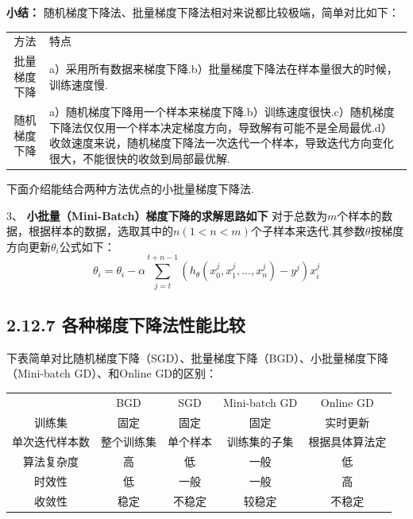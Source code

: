 \textbf{小结：}
随机梯度下降法、批量梯度下降法相对来说都比较极端，简单对比如下：

\begin{longtable}[]{ cl }
\begin{minipage}[b]{0.17\columnwidth}\centering\strut
方法\strut
\end{minipage} & \begin{minipage}[b]{0.78\columnwidth}\raggedright\strut
特点\strut
\end{minipage}\tabularnewline
\begin{minipage}[t]{0.17\columnwidth}\centering\strut
批量梯度下降\strut
\end{minipage} & \begin{minipage}[t]{0.78\columnwidth}\raggedright\strut
a）采用所有数据来梯度下降.b）批量梯度下降法在样本量很大的时候，训练速度慢.\strut
\end{minipage}\tabularnewline
\begin{minipage}[t]{0.17\columnwidth}\centering\strut
随机梯度下降\strut
\end{minipage} & \begin{minipage}[t]{0.78\columnwidth}\raggedright\strut
a）随机梯度下降用一个样本来梯度下降.b）训练速度很快.c）随机梯度下降法仅仅用一个样本决定梯度方向，导致解有可能不是全局最优.d）收敛速度来说，随机梯度下降法一次迭代一个样本，导致迭代方向变化很大，不能很快的收敛到局部最优解.\strut
\end{minipage}\tabularnewline
\end{longtable}

下面介绍能结合两种方法优点的小批量梯度下降法.

3、 \textbf{小批量（Mini-Batch）梯度下降的求解思路如下}
对于总数为$m$个样本的数据，根据样本的数据，选取其中的$n(1< n< m)$个子样本来迭代.其参数$\theta$按梯度方向更新$\theta_i$公式如下：
\[
\theta_i = \theta_i - \alpha \sum^{t+n-1}_{j=t}
        ( h_\theta (x^{j}_{0}, x^{j}_{1}, ... , x^{j}_{n} ) - y^j ) x^{j}_{i}
\]

\subsection{2.12.7
各种梯度下降法性能比较}\label{ux5404ux79cdux68afux5ea6ux4e0bux964dux6cd5ux6027ux80fdux6bd4ux8f83}

​
下表简单对比随机梯度下降（SGD）、批量梯度下降（BGD）、小批量梯度下降（Mini-batch
GD）、和Online GD的区别：

\begin{longtable}[]{ ccccc }
& BGD & SGD & Mini-batch GD & Online GD\tabularnewline
训练集 & 固定 & 固定 & 固定 & 实时更新\tabularnewline
单次迭代样本数 & 整个训练集 & 单个样本 & 训练集的子集 &
根据具体算法定\tabularnewline
算法复杂度 & 高 & 低 & 一般 & 低\tabularnewline
时效性 & 低 & 一般 & 一般 & 高\tabularnewline
收敛性 & 稳定 & 不稳定 & 较稳定 & 不稳定\tabularnewline
\end{longtable}

